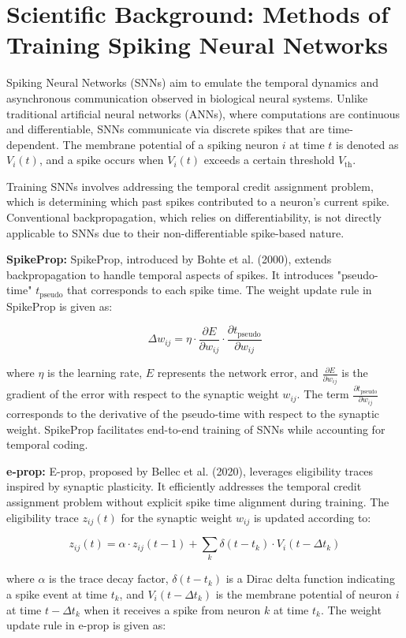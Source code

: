 \section*{Scientific Background: Methods of Training Spiking Neural Networks}

Spiking Neural Networks (SNNs) aim to emulate the temporal dynamics and asynchronous communication observed in biological neural systems. Unlike traditional artificial neural networks (ANNs), where computations are continuous and differentiable, SNNs communicate via discrete spikes that are time-dependent. The membrane potential of a spiking neuron $i$ at time $t$ is denoted as $V_i(t)$, and a spike occurs when $V_i(t)$ exceeds a certain threshold $V_{\text{th}}$.

Training SNNs involves addressing the temporal credit assignment problem, which is determining which past spikes contributed to a neuron's current spike. Conventional backpropagation, which relies on differentiability, is not directly applicable to SNNs due to their non-differentiable spike-based nature.

\textbf{SpikeProp:}
SpikeProp, introduced by Bohte et al. (2000), extends backpropagation to handle temporal aspects of spikes. It introduces "pseudo-time" $t_{\text{pseudo}}$ that corresponds to each spike time. The weight update rule in SpikeProp is given as:

\[
\Delta w_{ij} = \eta \cdot \frac{\partial E}{\partial w_{ij}} \cdot \frac{\partial t_{\text{pseudo}}}{\partial w_{ij}}
\]

where $\eta$ is the learning rate, $E$ represents the network error, and $\frac{\partial E}{\partial w_{ij}}$ is the gradient of the error with respect to the synaptic weight $w_{ij}$. The term $\frac{\partial t_{\text{pseudo}}}{\partial w_{ij}}$ corresponds to the derivative of the pseudo-time with respect to the synaptic weight. SpikeProp facilitates end-to-end training of SNNs while accounting for temporal coding.

\textbf{e-prop:}
E-prop, proposed by Bellec et al. (2020), leverages eligibility traces inspired by synaptic plasticity. It efficiently addresses the temporal credit assignment problem without explicit spike time alignment during training. The eligibility trace $z_{ij}(t)$ for the synaptic weight $w_{ij}$ is updated according to:

\[
z_{ij}(t) = \alpha \cdot z_{ij}(t - 1) + \sum_{k} \delta(t - t_k) \cdot V_i(t - \Delta t_k)
\]

where $\alpha$ is the trace decay factor, $\delta(t - t_k)$ is a Dirac delta function indicating a spike event at time $t_k$, and $V_i(t - \Delta t_k)$ is the membrane potential of neuron $i$ at time $t - \Delta t_k$ when it receives a spike from neuron $k$ at time $t_k$. The weight update rule in e-prop is given as:


